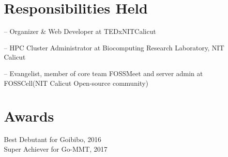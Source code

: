 \documentclass[margin,line]{resume}
\begin{document}
\begin{resume}

            


		    			

    \section{\mysidestyle Responsibilities Held } 
	\begin{list2}
	\item[--] Organizer \& Web Developer at TEDxNITCalicut
	\item[--] HPC Cluster Administrator at Biocomputing Research Laboratory, NIT Calicut
	\item[--] Evangelist,  member of core team FOSSMeet and server admin at FOSSCell(NIT Calicut Open-source community)
	
	
	\end{list2}
    \section{\mysidestyle Awards} 
         Best Debutant for Goibibo, 2016  \\
	Super Achiever for Go-MMT, 2017   


\end{resume}
\end{document}
